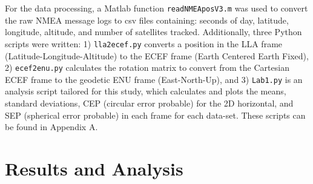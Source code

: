\documentclass[11pt]{article}
\begin{document}
\pagebreak


For the data processing, a Matlab function {\tt readNMEAposV3.m} was used to convert the raw NMEA message logs to csv files containing: seconds of day, latitude, longitude, altitude, and number of satellites tracked. Additionally, three Python scripts were written: 1) {\tt lla2ecef.py} converts a position in the LLA frame (Latitude-Longitude-Altitude) to the ECEF frame (Earth Centered Earth Fixed), 2) {\tt ecef2enu.py} calculates the rotation matrix to convert from the Cartesian ECEF frame to the geodetic ENU frame (East-North-Up), and 3) {\tt Lab1.py} is an analysis script tailored for this study, which calculates and plots the means, standard deviations, CEP (circular error probable) for the 2D horizontal, and SEP (spherical error probable) in each frame for each data-set. These scripts can be found in Appendix A.


\section{Results and Analysis}
\end{document}
